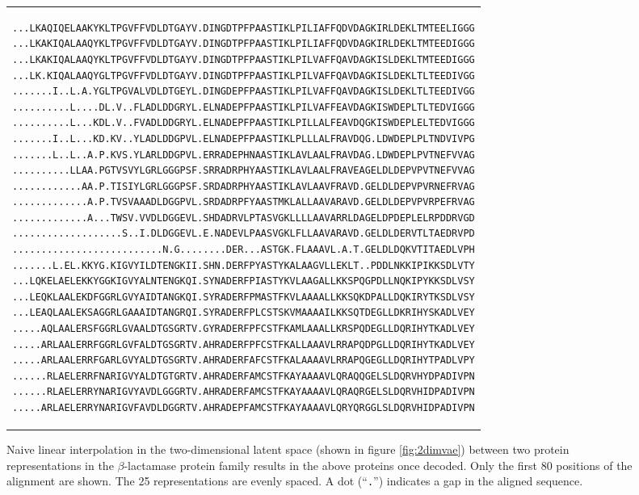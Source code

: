 \begin{figure}
    \begin{center}
    \begin{tabular}{c}
    \begin{lstlisting}[basicstyle=\ttfamily\footnotesize]
...LKAQIQELAAKYKLTPGVFFVDLDTGAYV.DINGDTPFPAASTIKLPILIAFFQDVDAGKIRLDEKLTMTEELIGGG
...LKAKIQALAAQYKLTPGVFFVDLDTGAYV.DINGDTPFPAASTIKLPILIAFFQDVDAGKIRLDEKLTMTEEDIGGG
...LKAKIQALAAQYKLTPGVFFVDLDTGAYV.DINGDTPFPAASTIKLPILVAFFQAVDAGKISLDEKLTMTEEDIGGG
...LK.KIQALAAQYGLTPGVFFVDLDTGAYV.DINGDTPFPAASTIKLPILVAFFQAVDAGKISLDEKLTLTEEDIVGG
.......I..L.A.YGLTPGVALVDLDTGEYL.DINGDEPFPAASTIKLPILVAFFQAVDAGKISLDEKLTLTEEDIVGG
..........L....DL.V..FLADLDDGRYL.ELNADEPFPAASTIKLPILVAFFEAVDAGKISWDEPLTLTEDVIGGG
..........L...KDL.V..FVADLDDGRYL.ELNADEPFPAASTIKLPILLALFEAVDQGKISWDEPLELTEDVIGGG
.......I..L...KD.KV..YLADLDDGPVL.ELNADEPFPAASTIKLPLLLALFRAVDQG.LDWDEPLPLTNDVIVPG
.......L..L..A.P.KVS.YLARLDDGPVL.ERRADEPHNAASTIKLAVLAALFRAVDAG.LDWDEPLPVTNEFVVAG
..........LLAA.PGTVSVYLGRLGGGPSF.SRRADRPHYAASTIKLAVLAALFRAVEAGELDLDEPVPVTNEFVVAG
............AA.P.TISIYLGRLGGGPSF.SRDADRPHYAASTIKLAVLAAVFRAVD.GELDLDEPVPVRNEFRVAG
.............A.P.TVSVAAADLDGGPVL.SRDADRPFYAASTMKLALLAAVARAVD.GELDLDEPVPVRPEFRVAG
.............A...TWSV.VVDLDGGEVL.SHDADRVLPTASVGKLLLLAAVARRLDAGELDPDEPLELRPDDRVGD
...................S..I.DLDGGEVL.E.NADEVLPAASVGKLFLLAAVARAVD.GELDLDERVTLTAEDRVPD
..........................N.G........DER...ASTGK.FLAAAVL.A.T.GELDLDQKVTITAEDLVPH
.......L.EL.KKYG.KIGVYILDTENGKII.SHN.DERFPYASTYKALAAGVLLEKLT..PDDLNKKIPIKKSDLVTY
...LQKELAELEKKYGGKIGVYALNTENGKQI.SYNADERFPIASTYKVLAAGALLKKSPQGPDLLNQKIPYKKSDLVSY
...LEQKLAALEKDFGGRLGVYAIDTANGKQI.SYRADERFPMASTFKVLAAAALLKKSQKDPALLDQKIRYTKSDLVSY
...LEAQLAALEKSAGGRLGAAAIDTANGRQI.SYRADERFPLCSTSKVMAAAAILKKSQTDEGLLDKRIHYSKADLVEY
.....AQLAALERSFGGRLGVAALDTGSGRTV.GYRADERFPFCSTFKAMLAAALLKRSPQDEGLLDQRIHYTKADLVEY
.....ARLAALERRFGGRLGVFALDTGSGRTV.AHRADERFPFCSTFKALLAAAVLRRAPQDPGLLDQRIHYTKADLVEY
.....ARLAALERRFGARLGVYALDTGSGRTV.AHRADERFAFCSTFKALAAAAVLRRAPQGEGLLDQRIHYTPADLVPY
......RLAELERRFNARIGVYALDTGTGRTV.AHRADERFAMCSTFKAYAAAAVLQRAQQGELSLDQRVHYDPADIVPN
......RLAELERRYNARIGVYAVDLGGGRTV.AHRADERFAMCSTFKAYAAAAVLQRAQRGELSLDQRVHIDPADIVPN
.....ARLAELERRYNARIGVFAVDLDGGRTV.AHRADEPFAMCSTFKAYAAAAVLQRYQRGGLSLDQRVHIDPADIVPN
\end{lstlisting}
\end{tabular}
\end{center}

    \caption{Naive linear interpolation in the two-dimensional latent space (shown in figure \ref{fig:2dimvae}) between two protein representations in the $\beta$-lactamase protein family results in the above proteins once decoded. Only the first 80 positions of the alignment are shown. The 25 representations are evenly spaced. A dot (``\texttt{.}'') indicates a gap in the aligned sequence.}
    \label{fig:interpolation}
\end{figure}